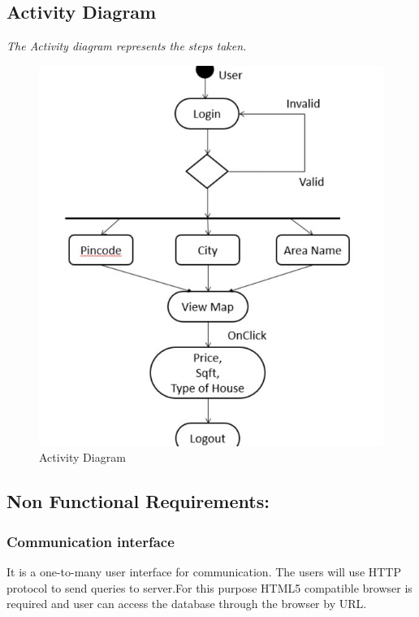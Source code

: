 \documentclass[11pt,fleqn]{book} %
\begin{document}
\subsection{Activity Diagram}
\emph{The Activity diagram represents the steps taken.}
\begin{center}
    \begin{figure}[h]
        \centering
        \includegraphics[scale=1.1]{Pictures/activity.jpg}
        \caption{Activity Diagram}
        \label{fig:my_label}
    \end{figure}
\end{center}

\newpage
\subsection{Non Functional Requirements:}
\subsubsection{\color{ocre}Communication interface}
It is a one-to-many user interface for communication. The users will use HTTP protocol to send queries to server.For this purpose HTML5 compatible browser is required and user can access the database through the browser by URL.
\end{document}
